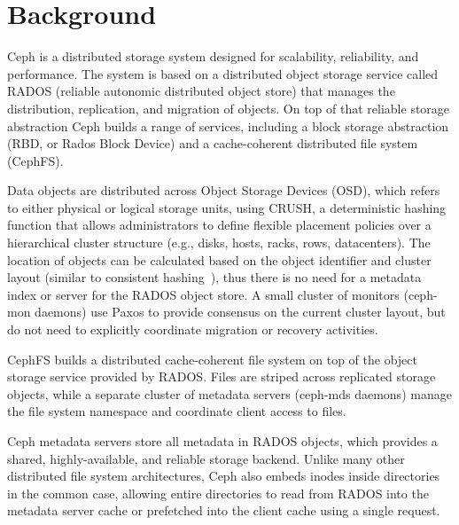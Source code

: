 \section{Background}
\label{sec:background}

Ceph\cite{Weil:2006:Ceph} is a distributed storage system designed for
scalability, reliability, and performance.  The system is based on a
distributed object storage service called RADOS (reliable autonomic distributed
object store) that manages the distribution, replication, and migration of
objects.  On top of that reliable storage abstraction Ceph builds a range of
services, including a block storage abstraction (RBD, or Rados Block Device)
and a cache-coherent distributed file system (CephFS).

Data objects are distributed across Object Storage Devices (OSD), which refers
to either physical or logical storage units, using CRUSH\cite{Weil:2006:Crush},
a deterministic hashing function that allows administrators to define flexible
placement policies over a hierarchical cluster structure (e.g., disks, hosts,
racks, rows, datacenters).  The location of objects can be calculated based on
the object identifier and cluster layout (similar to consistent
hashing~\cite{karger1997consistent}), thus there is no need for a metadata
index or server for the RADOS object store.
A small cluster of monitors (ceph-mon daemons) use Paxos to provide consensus
on the current cluster layout, but do not need to explicitly coordinate
migration or recovery activities.

CephFS builds a distributed cache-coherent file system on top of the object
storage service provided by RADOS.  Files are striped across replicated
storage objects, while a separate cluster of metadata servers (ceph-mds
daemons) manage the file system namespace and coordinate client access to
files.  

Ceph metadata servers store all metadata in RADOS objects, which provides a
shared, highly-available, and reliable storage backend.  Unlike many other
distributed file system architectures, Ceph also embeds inodes inside
directories in the common case, allowing entire directories to read from RADOS
into the metadata server cache or prefetched into the client cache using a
single request.

